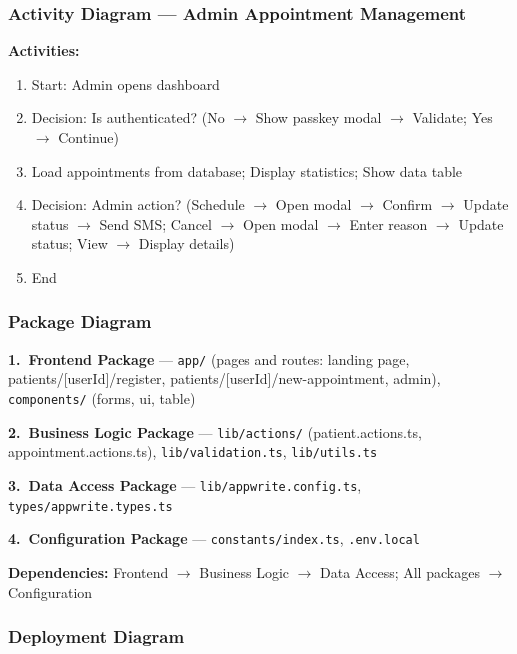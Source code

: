 \documentclass[11pt,a4paper]{article}
\begin{document}
\subsubsection{Activity Diagram --- Admin Appointment Management}

\textbf{Activities:}
\begin{enumerate}
    \item Start: Admin opens dashboard
    \item Decision: Is authenticated? (No $\rightarrow$ Show passkey modal $\rightarrow$ Validate; Yes $\rightarrow$ Continue)
    \item Load appointments from database; Display statistics; Show data table
    \item Decision: Admin action? (Schedule $\rightarrow$ Open modal $\rightarrow$ Confirm $\rightarrow$ Update status $\rightarrow$ Send SMS; Cancel $\rightarrow$ Open modal $\rightarrow$ Enter reason $\rightarrow$ Update status; View $\rightarrow$ Display details)
    \item End
\end{enumerate}

\subsubsection{Package Diagram}

\textbf{1.\ Frontend Package} --- \texttt{app/} (pages and routes: landing page, patients/[userId]/register, patients/[userId]/new-appointment, admin), \texttt{components/} (forms, ui, table)

\textbf{2.\ Business Logic Package} --- \texttt{lib/actions/} (patient.actions.ts, appointment.actions.ts), \texttt{lib/validation.ts}, \texttt{lib/utils.ts}

\textbf{3.\ Data Access Package} --- \texttt{lib/appwrite.config.ts}, \texttt{types/appwrite.types.ts}

\textbf{4.\ Configuration Package} --- \texttt{constants/index.ts}, \texttt{.env.local}

\textbf{Dependencies:} Frontend $\rightarrow$ Business Logic $\rightarrow$ Data Access; All packages $\rightarrow$ Configuration

\subsubsection{Deployment Diagram}
\end{document}
